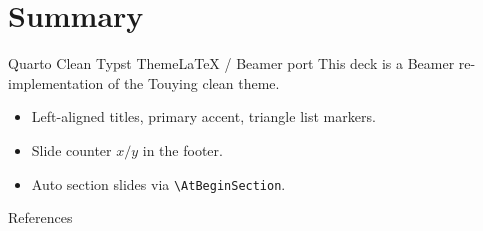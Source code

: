\documentclass[aspectratio=169, 11pt]{beamer}
\begin{document}
\section{Summary}

\begin{frame}{Quarto Clean Typst Theme}{LaTeX / Beamer port}
  This deck is a Beamer re-implementation of the Touying clean theme.
  \begin{itemize}
    \item Left-aligned titles, primary accent, triangle list markers.
    \item Slide counter \(x / y\) in the footer.
    \item Auto section slides via \texttt{\textbackslash AtBeginSection}.
  \end{itemize}
\end{frame}

\begin{frame}[allowframebreaks]{References}
  \printbibliography[heading=none]
\end{frame}
\end{document}
